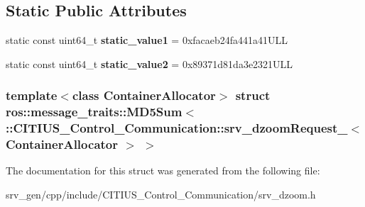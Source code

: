 \subsection*{\-Static \-Public \-Attributes}
\begin{DoxyCompactItemize}
\item 
\hypertarget{structros_1_1message__traits_1_1_m_d5_sum_3_01_1_1_c_i_t_i_u_s___control___communication_1_1srv_7e69024f396aeffd2b381e4eb10b8d77_a75adad9b02099a295f0a374589fa6739}{static const uint64\-\_\-t {\bfseries static\-\_\-value1} = 0xfacaeb24fa441a41\-U\-L\-L}\label{structros_1_1message__traits_1_1_m_d5_sum_3_01_1_1_c_i_t_i_u_s___control___communication_1_1srv_7e69024f396aeffd2b381e4eb10b8d77_a75adad9b02099a295f0a374589fa6739}

\item 
\hypertarget{structros_1_1message__traits_1_1_m_d5_sum_3_01_1_1_c_i_t_i_u_s___control___communication_1_1srv_7e69024f396aeffd2b381e4eb10b8d77_a1ec2b8c48b39730e75fa091ae3e2d3fb}{static const uint64\-\_\-t {\bfseries static\-\_\-value2} = 0x89371d81da3e2321\-U\-L\-L}\label{structros_1_1message__traits_1_1_m_d5_sum_3_01_1_1_c_i_t_i_u_s___control___communication_1_1srv_7e69024f396aeffd2b381e4eb10b8d77_a1ec2b8c48b39730e75fa091ae3e2d3fb}

\end{DoxyCompactItemize}
\subsubsection*{template$<$class Container\-Allocator$>$ struct ros\-::message\-\_\-traits\-::\-M\-D5\-Sum$<$ \-::\-C\-I\-T\-I\-U\-S\-\_\-\-Control\-\_\-\-Communication\-::srv\-\_\-dzoom\-Request\-\_\-$<$ Container\-Allocator $>$ $>$}



\-The documentation for this struct was generated from the following file\-:\begin{DoxyCompactItemize}
\item 
srv\-\_\-gen/cpp/include/\-C\-I\-T\-I\-U\-S\-\_\-\-Control\-\_\-\-Communication/srv\-\_\-dzoom.\-h\end{DoxyCompactItemize}
